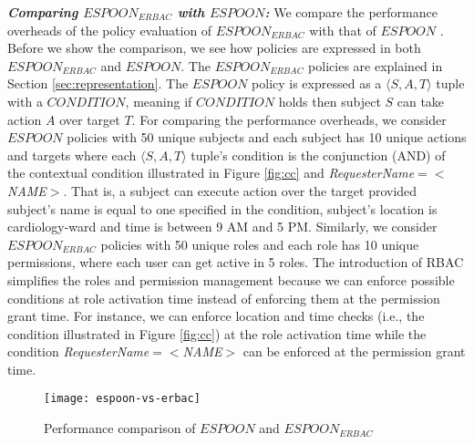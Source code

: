 \documentclass[final,5p,times,twocolumn]{elsarticle}
\begin{document}
\emph{\textbf{Comparing $\mathit{ESPOON_{ERBAC}}$ with $\mathit{ESPOON}$:}}
We compare the performance overheads of the policy evaluation of $\mathit{ESPOON_{ERBAC}}$ with that of $\mathit{ESPOON}$ \cite{Asghar2011ARES}. Before we show the comparison, we see how policies are expressed in both $\mathit{ESPOON_{ERBAC}}$ and $\mathit{ESPOON}$. The $\mathit{ESPOON_{ERBAC}}$ policies are explained in Section \ref{sec:representation}. The $\mathit{ESPOON}$ policy is expressed as a $\langle S, A, T \rangle$ tuple with a $\mathit{CONDITION}$, meaning if $\mathit{CONDITION}$ holds then subject $S$ can take action $A$ over target $T$. For comparing the performance overheads, we consider $\mathit{ESPOON}$ policies with 50 unique subjects and each subject has 10 unique actions and targets where each $\langle S, A, T \rangle$ tuple's condition is the conjunction (AND) of the contextual condition illustrated in Figure \ref{fig:cc} and \emph{RequesterName$=<$NAME$>$}. That is, a subject can execute action over the target provided subject's name is equal to one specified in the condition, subject's location is cardiology-ward and time is between 9 AM and 5 PM. Similarly, we consider $\mathit{ESPOON_{ERBAC}}$ policies with 50 unique roles and each role has 10 unique permissions, where each user can get active in 5 roles. The introduction of RBAC simplifies the roles and permission management because we can enforce possible conditions at role activation time instead of enforcing them at the permission grant time. For instance, we can enforce location and time checks (i.e., the condition illustrated in Figure \ref{fig:cc}) at the role activation time while the condition \emph{RequesterName$=<$NAME$>$} can be enforced at the permission grant time. 

\begin{figure}
\centering
\texttt{[image: espoon-vs-erbac]} \caption{Performance comparison of $\mathit{ESPOON}$ and $\mathit{ESPOON_{ERBAC}}$}
\label{fig:espoon-vs-erbac}
\end{figure}
\end{document}
